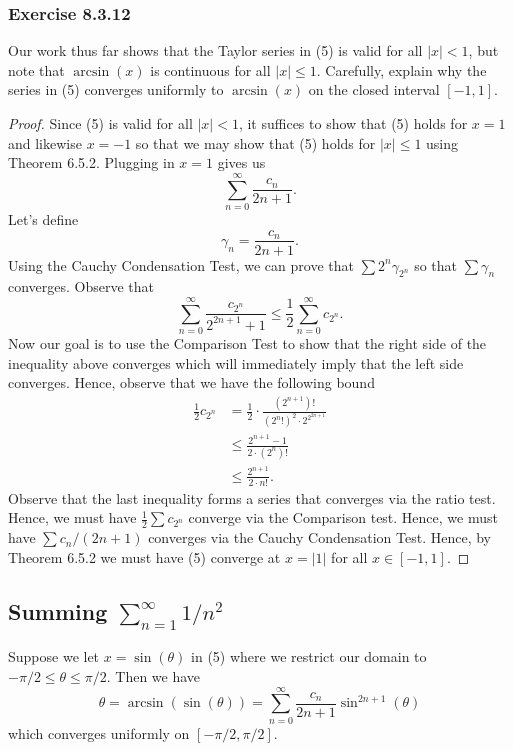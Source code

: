 \subsubsection{Exercise 8.3.12} Our work thus far shows that the Taylor series in (5) is valid  for all \( |  x  |  < 1  \), but note that \( \arcsin(x)  \) is continuous for all \( |  x  | \leq 1   \). Carefully, explain why the series in (5) converges uniformly to \( \arcsin(x)  \) on the closed interval \( [-1,1] \).
\begin{proof}
Since (5) is valid for all \( |  x  | < 1   \), it suffices to show that (5) holds for \( x = 1  \) and likewise \( x = -1  \) so that we may show that (5) holds for \( |  x  | \leq 1  \) using Theorem 6.5.2. Plugging in \( x = 1  \) gives us 
\[  \sum_{ n=0 }^{ \infty  } \frac{ c_{n}  }{  2n+1  }. \] Let's define 
\[  \gamma_{n} = \frac{ c_{n}  }{  2n+1  }. \]Using the Cauchy Condensation Test, we can prove that  \( \sum 2^{n} \gamma_{2^n }  \) so that \( \sum \gamma_{n}   \) converges. Observe that 
\[  \sum_{ n=0 }^{ \infty  } \frac{ c_{2^n} }{ 2^{2n+1} + 1 } \leq \frac{ 1 }{ 2 } \sum_{ n=0 }^{ \infty  } c_{2^{n}}. \]
Now our goal is to use the Comparison Test to show that the right side of the inequality above converges which will immediately imply that the left side converges. Hence, observe that we have the following bound
\begin{align*}
    \frac{ 1 }{ 2 }  c_{2^{n}} &= \frac{ 1 }{ 2 }  \cdot \frac{ (2^{n+1})! }{ (2^{n}!)^{2} \cdot 2^{2^{2n+1}}  }  \\
                               &\leq \frac{ 2^{n+1} - 1  }{ 2 \cdot (2^{n})!  } \\  
                               &\leq \frac{ 2^{n+1} }{ 2 \cdot n! }.  
\end{align*}
Observe that the last inequality forms a series that converges via the ratio test. Hence, we must have \( \frac{ 1 }{  2 } \sum c_{2^{n}}  \) converge via the Comparison test. Hence, we must have  \(  \sum  c_{n} / (2n+1)  \) converges via the Cauchy Condensation Test. Hence, by Theorem 6.5.2 we must have (5) converge at \( x = |  1  |  \) for all \(  x \in [-1 , 1 ]  \).
\end{proof}


\subsection{Summing \( \sum_{ n=1 }^{ \infty  } 1 / n^{2} \)}

Suppose we let \( x = \sin( \theta ) \) in (5) where we restrict our domain to \( - \pi / 2 \leq \theta \leq \pi /2   \). Then we have
\[  \theta = \arcsin( \sin(\theta)) = \sum_{ n=0  }^{ \infty  } \frac{ c_{n}  }{ 2n+1 } \sin^{2n+1}(\theta) \] which converges uniformly on \( [-\pi/2 , \pi/2 ] \).

